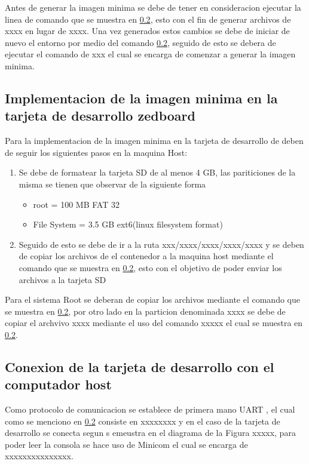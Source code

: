 Antes de generar la imagen minima se debe de tener en consideracion ejecutar la linea de comando que se muestra en \ref{}, esto con el fin de generar archivos de xxxx en lugar de xxxx. Una vez generados estos cambios se debe de iniciar de nuevo el entorno por medio del comando \ref{}, seguido de esto se debera de ejecutar el comando de xxx el cual se encarga de comenzar a generar la imagen minima. 

\subsection{Implementacion de la imagen minima en la tarjeta de desarrollo zedboard}

Para la implementacion de la imagen minima en la tarjeta de desarrollo de deben de seguir los siguientes pasos en la maquina Host:

\begin{enumerate}
    \item Se debe de formatear la tarjeta SD de al menos 4 GB, las pariticiones de la misma se tienen que observar de la siguiente forma 
    \begin{itemize}
        \item root = 100 MB FAT 32
        \item File System = 3.5 GB ext6(linux filesystem format)
        \end{itemize} 
    \item Seguido de esto se debe de ir a la ruta xxx/xxxx/xxxx/xxxx/xxxx y se deben de copiar los archivos de el contenedor a la maquina host mediante el comando que se muestra en \ref{}, esto con el objetivo de poder enviar los archivos a la tarjeta SD
\end{enumerate}

Para el sistema Root se deberan de copiar los archivos mediante el comando que se muestra en \ref{}, por otro lado en la particion denominada xxxx se debe de copiar el archvivo xxxx mediante el uso del comando xxxxx el cual se muestra en \ref{}.

\subsection{Conexion de la tarjeta de desarrollo con el computador host}

Como protocolo de comunicacion se establece de primera mano UART , el cual como se menciono en \ref{} consiste en xxxxxxxx y en el caso de la tarjeta de desarrollo se conecta segun s emeustra en el diagrama de la Figura xxxxx, para poder leer la consola se hace uso de Minicom el cual se encarga de xxxxxxxxxxxxxxx.

